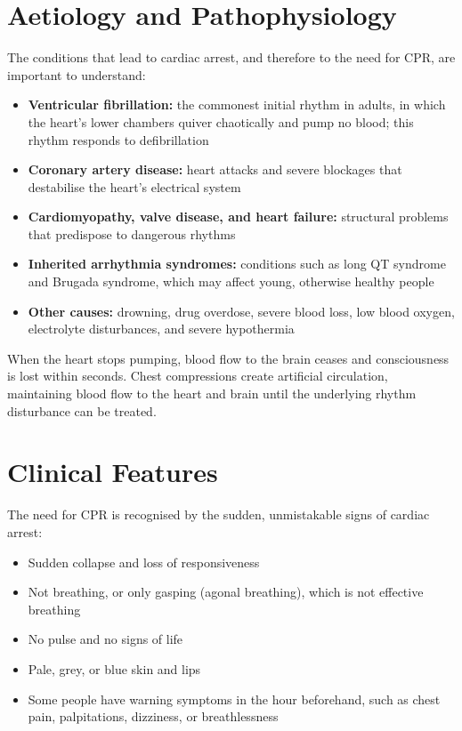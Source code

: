 \section*{Aetiology and Pathophysiology}
The conditions that lead to cardiac arrest, and therefore to the need for CPR, are important to understand:
\begin{itemize}
    \item \textbf{Ventricular fibrillation:} the commonest initial rhythm in adults, in which the heart's lower chambers quiver chaotically and pump no blood; this rhythm responds to defibrillation
    \item \textbf{Coronary artery disease:} heart attacks and severe blockages that destabilise the heart's electrical system
    \item \textbf{Cardiomyopathy, valve disease, and heart failure:} structural problems that predispose to dangerous rhythms
    \item \textbf{Inherited arrhythmia syndromes:} conditions such as long QT syndrome and Brugada syndrome, which may affect young, otherwise healthy people
    \item \textbf{Other causes:} drowning, drug overdose, severe blood loss, low blood oxygen, electrolyte disturbances, and severe hypothermia
\end{itemize}
When the heart stops pumping, blood flow to the brain ceases and consciousness is lost within seconds. Chest compressions create artificial circulation, maintaining blood flow to the heart and brain until the underlying rhythm disturbance can be treated.

\section*{Clinical Features}
The need for CPR is recognised by the sudden, unmistakable signs of cardiac arrest:
\begin{itemize}
    \item Sudden collapse and loss of responsiveness
    \item Not breathing, or only gasping (agonal breathing), which is not effective breathing
    \item No pulse and no signs of life
    \item Pale, grey, or blue skin and lips
    \item Some people have warning symptoms in the hour beforehand, such as chest pain, palpitations, dizziness, or breathlessness
\end{itemize}

